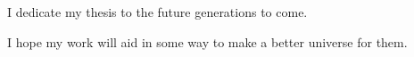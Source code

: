 \centerline{I dedicate my thesis to the future generations to come.}
\centerline{I hope my work will aid in some way to make a better universe for them.}